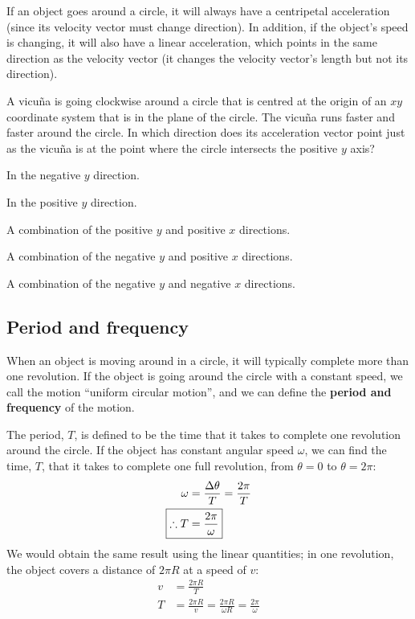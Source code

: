 If an object goes around a circle, it will always have a centripetal acceleration (since its velocity vector must change direction). In addition, if the object's speed is changing, it will also have a linear acceleration, which points in the same direction as the velocity vector (it changes the velocity vector's length but not its direction).

\begin{checkpoint}{\begin{MCquestion}{A vicu\~na is going clockwise around a circle that is centred at the origin of an $xy$ coordinate system that is in the plane of the circle. The vicu\~na runs faster and faster around the circle. In which direction does its acceleration vector point just as the vicu\~na is at the point where the circle intersects the positive $y$ axis?}
\item In the negative $y$ direction.
\item In the positive $y$ direction.
\item A combination of the positive $y$ and positive $x$ directions.
\item A combination of the negative $y$ and positive $x$ directions. \correct
\item A combination of the negative $y$ and negative $x$ directions.
\end{MCquestion}}
\end{checkpoint}

\subsection{Period and frequency}
When an object is moving around in a circle, it will typically complete more than one revolution. If the object is going around the circle with a constant speed, we call the motion ``uniform circular motion'', and we can define the \textbf{period and frequency} of the motion. 

The period, $T$, is defined to be the time that it takes to complete one revolution around the circle. If the object has constant angular speed $\omega$, we can find the time, $T$, that it takes to complete one full revolution, from $\theta=0$ to $\theta=2\pi$:
\begin{align}
\omega&=\frac{\Delta \theta}{T}=\frac{2\pi}{T}\nonumber\\
\Aboxed{\therefore T&=\frac{2\pi}{\omega}}
\end{align}
We would obtain the same result using the linear quantities; in one revolution, the object covers a distance of $2\pi R$ at a speed of $v$:
\begin{align*}
v&=\frac{2\pi R}{T}\\
T&=\frac{2\pi R}{v}=\frac{2\pi R}{\omega R}=\frac{2\pi}{\omega}
\end{align*}

